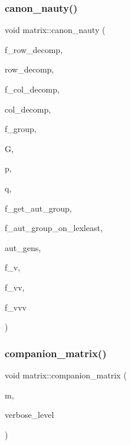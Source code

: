 \subsubsection{\texorpdfstring{canon\+\_\+nauty()}{canon\_nauty()}}
{\footnotesize\ttfamily void matrix\+::canon\+\_\+nauty (\begin{DoxyParamCaption}\item[{\mbox{\hyperlink{galois_8h_a09fddde158a3a20bd2dcadb609de11dc}{I\+NT}}}]{f\+\_\+row\+\_\+decomp,  }\item[{\mbox{\hyperlink{class_vector}{Vector}} \&}]{row\+\_\+decomp,  }\item[{\mbox{\hyperlink{galois_8h_a09fddde158a3a20bd2dcadb609de11dc}{I\+NT}}}]{f\+\_\+col\+\_\+decomp,  }\item[{\mbox{\hyperlink{class_vector}{Vector}} \&}]{col\+\_\+decomp,  }\item[{\mbox{\hyperlink{galois_8h_a09fddde158a3a20bd2dcadb609de11dc}{I\+NT}}}]{f\+\_\+group,  }\item[{\mbox{\hyperlink{classperm__group}{perm\+\_\+group}} \&}]{G,  }\item[{\mbox{\hyperlink{classpermutation}{permutation}} \&}]{p,  }\item[{\mbox{\hyperlink{classpermutation}{permutation}} \&}]{q,  }\item[{\mbox{\hyperlink{galois_8h_a09fddde158a3a20bd2dcadb609de11dc}{I\+NT}}}]{f\+\_\+get\+\_\+aut\+\_\+group,  }\item[{\mbox{\hyperlink{galois_8h_a09fddde158a3a20bd2dcadb609de11dc}{I\+NT}}}]{f\+\_\+aut\+\_\+group\+\_\+on\+\_\+lexleast,  }\item[{\mbox{\hyperlink{class_vector}{Vector}} \&}]{aut\+\_\+gens,  }\item[{\mbox{\hyperlink{galois_8h_a09fddde158a3a20bd2dcadb609de11dc}{I\+NT}}}]{f\+\_\+v,  }\item[{\mbox{\hyperlink{galois_8h_a09fddde158a3a20bd2dcadb609de11dc}{I\+NT}}}]{f\+\_\+vv,  }\item[{\mbox{\hyperlink{galois_8h_a09fddde158a3a20bd2dcadb609de11dc}{I\+NT}}}]{f\+\_\+vvv }\end{DoxyParamCaption})}

\mbox{\label{classmatrix_acd603a86fd752eb4da1a060bdaab478f}} 
\subsubsection{\texorpdfstring{companion\+\_\+matrix()}{companion\_matrix()}}
{\footnotesize\ttfamily void matrix\+::companion\+\_\+matrix (\begin{DoxyParamCaption}\item[{\mbox{\hyperlink{classunipoly}{unipoly}} \&}]{m,  }\item[{\mbox{\hyperlink{galois_8h_a09fddde158a3a20bd2dcadb609de11dc}{I\+NT}}}]{verbose\+\_\+level }\end{DoxyParamCaption})}

